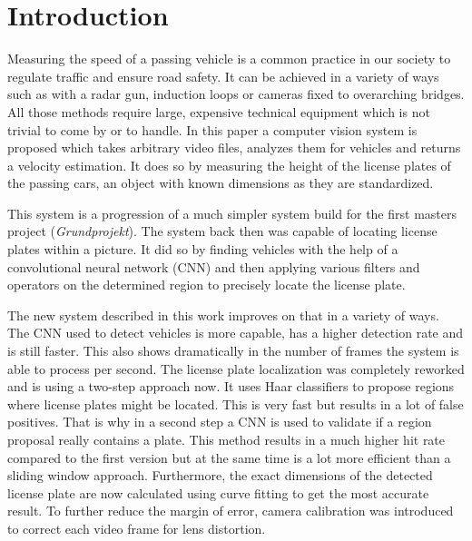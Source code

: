 \chapter{Introduction}\label{ch:introduction}

Measuring the speed of a passing vehicle is a common practice in our society to regulate traffic and ensure road safety.
It can be achieved in a variety of ways such as with a radar gun, induction loops or cameras fixed to overarching bridges.
All those methods require large, expensive technical equipment which is not trivial to come by or to handle.
In this paper a computer vision system is proposed which takes arbitrary video files, analyzes them for vehicles and returns a velocity estimation.
It does so by measuring the height of the license plates of the passing cars, an object with known dimensions as they are standardized.

This system is a progression of a much simpler system build for the first masters project (\textit{Grundprojekt}).
The system back then was capable of locating license plates within a picture.
It did so by finding vehicles with the help of a convolutional neural network (CNN) and then applying various filters and operators on the determined region to precisely locate the license plate.

The new system described in this work improves on that in a variety of ways.
The CNN used to detect vehicles is more capable, has a higher detection rate and is still faster.
This also shows dramatically in the number of frames the system is able to process per second.
The license plate localization was completely reworked and is using a two-step approach now.
It uses Haar classifiers to propose regions where license plates might be located.
This is very fast but results in a lot of false positives.
That is why in a second step a CNN is used to validate if a region proposal really contains a plate.
This method results in a much higher hit rate compared to the first version but at the same time is a lot more efficient than a sliding window approach.
Furthermore, the exact dimensions of the detected license plate are now calculated using curve fitting to get the most accurate result.
To further reduce the margin of error, camera calibration was introduced to correct each video frame for lens distortion.
